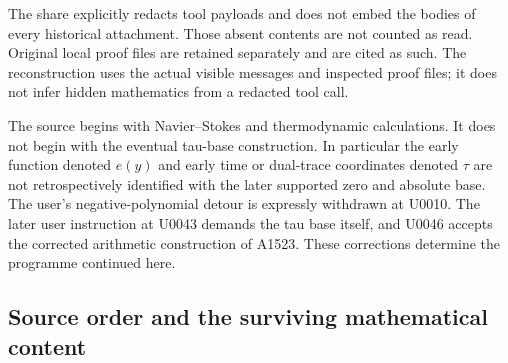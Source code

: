 The share explicitly redacts tool payloads and does not embed the bodies
of every historical attachment. Those absent contents are not counted as
read. Original local proof files are retained separately and are cited as
such. The reconstruction uses the actual visible messages and inspected
proof files; it does not infer hidden mathematics from a redacted tool call.

The source begins with Navier--Stokes and thermodynamic calculations. It
does not begin with the eventual tau-base construction. In particular the
early function denoted $e(y)$ and early time or dual-trace coordinates
denoted $\tau$ are not retrospectively identified with the later supported
zero and absolute base. The user's negative-polynomial detour is expressly
withdrawn at U0010. The later user instruction at U0043 demands the tau
base itself, and U0046 accepts the corrected arithmetic construction of
A1523. These corrections determine the programme continued here.

\subsection{Source order and the surviving mathematical content}

